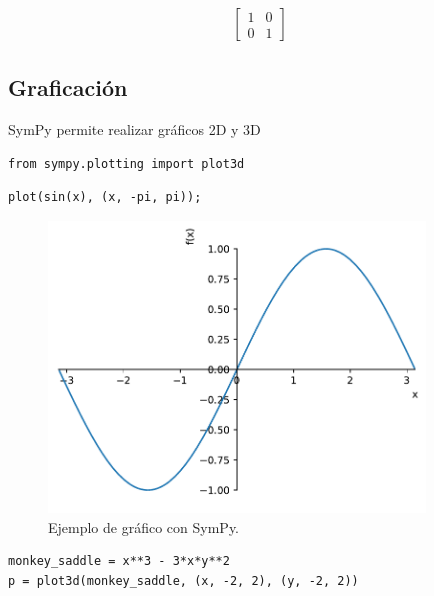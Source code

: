 \[\begin{aligned}
\left[\begin{matrix}1 & 0\\0 & 1\end{matrix}\right]
\end{aligned}\]

\subsection{Graficación}

SymPy permite realizar gráficos 2D y 3D

\begin{listing}[H]
\begin{verbatim}
from sympy.plotting import plot3d
\end{verbatim}
\end{listing}

\begin{listing}[H]
\begin{verbatim}
plot(sin(x), (x, -pi, pi));
\end{verbatim}
\end{listing}

\begin{figure}[H]
	\centering
	\includegraphics[width=10cm]{img/sympy/sympy_grafico}
	\caption{Ejemplo de gráfico con SymPy.}
	\label{fig:grafico_sympy}
\end{figure}

\begin{listing}[H]
\begin{verbatim}
monkey_saddle = x**3 - 3*x*y**2
p = plot3d(monkey_saddle, (x, -2, 2), (y, -2, 2))
\end{verbatim}
\end{listing}

